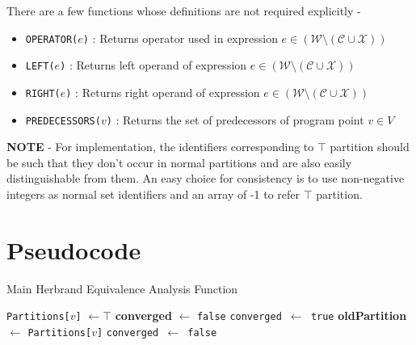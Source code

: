 \bigbreak \noindent There are a few functions whose definitions are not required explicitly - 
\begin{itemize} \tightlist
    \item \texttt{OPERATOR($e$)} : Returns operator used in expression $e \in (\mathcal W \setminus (\mathcal C \cup \mathcal X))$
    \item \texttt{LEFT($e$)} : Returns left operand of expression $e \in (\mathcal W \setminus (\mathcal C \cup \mathcal X))$
    \item \texttt{RIGHT($e$)} : Returns right operand of expression $e \in (\mathcal W \setminus (\mathcal C \cup \mathcal X))$
    \item \texttt{PREDECESSORS($v$)} : Returns the set of predecessors of program point $v \in V$
\end{itemize}

\bigbreak \noindent \textbf{NOTE} - For implementation, the identifiers corresponding to 
$\top$ partition should be such that they don't occur in normal partitions and are also 
easily distinguishable from them. An easy choice for consistency is to use non-negative 
integers as normal set identifiers and an array of -1 to refer $\top$ partition.

\section{Pseudocode}
\label{sec:Pseudocode}

\begin{algorithm}
    \caption{Main Herbrand Equivalence Analysis Function}
    \label{alg:HerbrandEquivalenceAnalysis}
    \begin{algorithmic}
            \State {}
                \State \texttt{Partitions[$v$]} $\gets \top$
            \EndFor
            \State {}
            \State {}
            \State {}
            \State \textbf{converged} $\gets$ \texttt{false}
                \State \texttt{converged $\gets$ true}
                    \State \textbf{oldPartition} $\gets$ \texttt{Partitions[$v$]}
                    \State {}
                        \State {}
                    \Else
                        \State {}
                    \EndIf
                    \State {}
                        \State \texttt{converged $\gets$ false}
                    \EndIf
                \EndFor
            \EndWhile
        \EndProcedure
    \end{algorithmic}
\end{algorithm}


